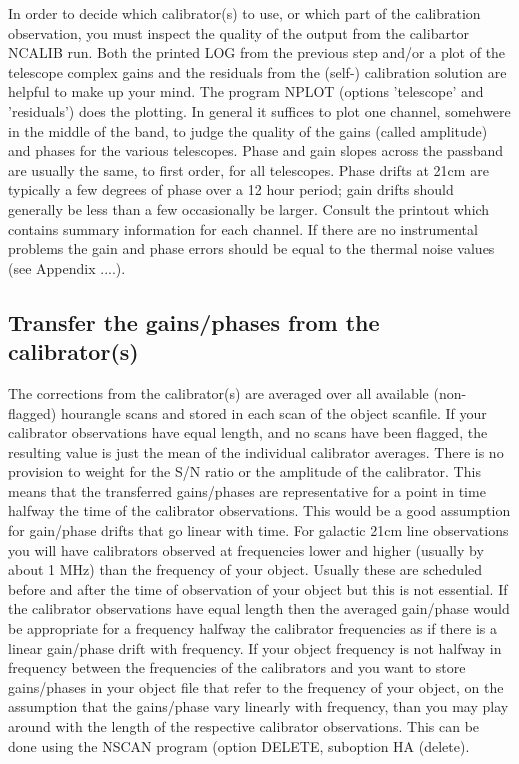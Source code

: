 In order to decide which calibrator(s) to use, or which part of the calibration
observation, you must inspect the quality of the output from the calibartor
NCALIB run. Both the printed LOG from the previous step and/or a plot of the
telescope complex gains and the residuals from the (self-) calibration solution
are helpful to make up your mind. The program NPLOT (options 'telescope' and
'residuals') does the plotting. In general it suffices to plot one channel,
somehwere in the middle of the band, to judge the quality of the gains (called
amplitude) and phases for the various telescopes. Phase and gain slopes across
the passband are usually the same, to first order, for all telescopes. Phase
drifts at 21cm are typically a few degrees of phase over a 12 hour period; gain
drifts 
should generally be less than a few %
occasionally be larger. Consult the printout which contains summary information
for each channel. If there are no instrumental problems the gain and phase
errors should be equal to the thermal noise values (see Appendix ....). 


\subsection{Transfer the gains/phases from the calibrator(s)} 
\label{.detail.transcal} 

The corrections from the calibrator(s) are averaged over all available (non-
flagged) hourangle scans and stored in each scan of the object scanfile. If
your calibrator observations have equal length, and no scans have been flagged,
the resulting value is just the mean of the individual calibrator averages.
There is no provision to weight for the S/N ratio or the amplitude of the
calibrator. This means that the transferred gains/phases are representative for
a point in time halfway the time of the calibrator observations. This would be
a good assumption for gain/phase drifts that go linear with time. For galactic
21cm line observations you will have calibrators observed at frequencies lower
and higher (usually by about 1 MHz) than the frequency of your object. Usually
these are scheduled before and after the time of observation of your object but
this is not essential. If the calibrator observations have equal length then
the averaged gain/phase would be appropriate for a frequency halfway the
calibrator frequencies as if there is a linear gain/phase drift with frequency.
If your object frequency is not halfway in frequency between the frequencies of
the calibrators and you want to store gains/phases in your object file that
refer to the frequency of your object, on the assumption that the gains/phase
vary linearly with frequency, than you may play around with the length of the
respective calibrator observations. This can be done using the NSCAN program
(option DELETE, suboption HA (delete). 


